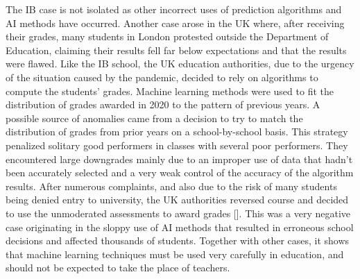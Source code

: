 The IB case is not isolated as other incorrect uses of prediction algorithms and AI methods have occurred. Another case arose in the UK where, after receiving their grades, many students in London protested outside the Department of Education, claiming their results fell far below expectations and that the results were flawed. Like the IB school, the UK education authorities, due to the urgency of the situation caused by the pandemic, decided to rely on algorithms to compute the students' grades. Machine learning methods were used to fit the distribution of grades awarded in 2020 to the pattern of previous years. A possible source of anomalies came from a decision to try to match the distribution of grades from prior years on a school-by-school basis. This strategy penalized solitary good performers in classes with several poor performers. They encountered large downgrades mainly due to an improper use of data that hadn't been accurately selected and a very weak control of the accuracy of the algorithm results. After numerous complaints, and also due to the risk of many students being denied entry to university, the UK authorities reversed course and decided to use the unmoderated assessments to award grades [\citealt{chap:05:Edwards:2021}]. This was a very negative case originating in the sloppy use of AI methods that resulted in erroneous school decisions and affected thousands of students. Together with other cases, it shows that machine learning techniques must be used very carefully in education, and should not be expected to take the place of teachers.

